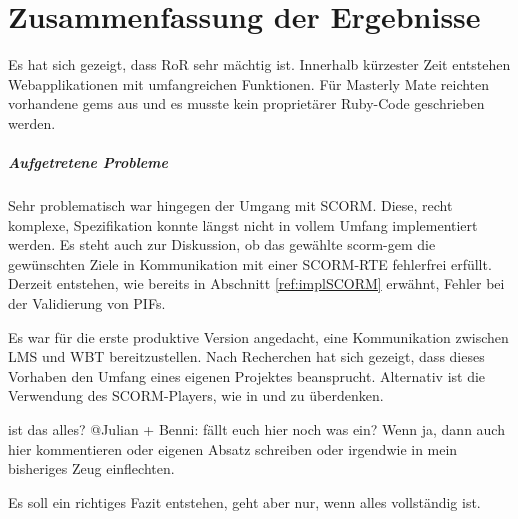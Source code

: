 \chapter{Zusammenfassung der Ergebnisse}\label{ref:chaptConclusion}
Es hat sich gezeigt, dass \ac{RoR} sehr mächtig ist. Innerhalb kürzester Zeit
entstehen Webapplikationen mit umfangreichen Funktionen. Für Masterly Mate
reichten vorhandene gems aus und es musste kein proprietärer Ruby-Code
geschrieben werden.

\paragraph{Aufgetretene Probleme}\label{ref:problems}
Sehr problematisch war hingegen der Umgang mit SCORM. Diese, recht komplexe,
Spezifikation konnte längst nicht in vollem Umfang implementiert werden. Es
steht auch zur Diskussion, ob das gewählte scorm-gem die gewünschten Ziele in
Kommunikation mit einer SCORM-RTE fehlerfrei erfüllt. Derzeit entstehen, wie
bereits in Abschnitt \ref{ref:implSCORM} erwähnt, Fehler bei der Validierung von
PIFs.

Es war für die erste produktive Version angedacht, eine Kommunikation zwischen
\ac{LMS} und \ac{WBT} bereitzustellen. Nach Recherchen hat sich gezeigt, dass
dieses Vorhaben den Umfang eines eigenen Projektes beansprucht. Alternativ ist
die Verwendung des SCORM-Players, wie in \cite{mitter:2005} und
\cite{knall:2005} zu überdenken.

\begin{k}
ist das alles? @Julian + Benni: fällt euch hier noch was ein? Wenn ja, dann auch
hier kommentieren oder eigenen Absatz schreiben oder irgendwie in mein
bisheriges Zeug einflechten.

Es soll ein richtiges Fazit entstehen, geht aber nur, wenn alles vollständig
ist.
\end{k}